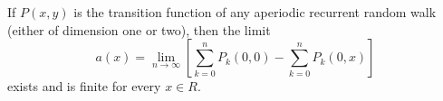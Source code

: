 If \(P(x,y)\) is the transition function of any aperiodic recurrent random walk (either of dimension one or two), then the limit
\[
a(x) = \lim_{n \to \infty} \left[ \sum_{k=0}^{n} P_k(0,0) - \sum_{k=0}^{n} P_k(0,x) \right]
\]
exists and is finite for every \(x \in R\).

